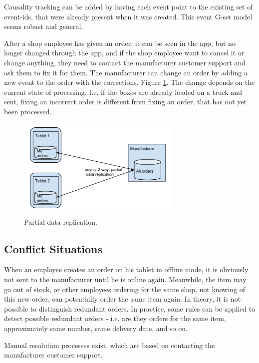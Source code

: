 \documentclass[11pt,a4paper]{report}
\begin{document}
Causality tracking can be added by having each event point to the existing set of event-ids, that were already present when it was created. This event G-set model seems robust and general.

After a shop employee has given an order, it can be seen in the app, but no longer changed through the app, and if the shop employee want to cancel it or change anything, they need to contact the manufacturer customer support and ask them to fix it for them. The manufacturer can change an order by adding a new event to the order with the corrections, Figure \ref{fig:partial_data_replication}. The change depends on the current state of processing. I.e. if the boxes are already loaded on a truck and sent, fixing an incorrect order is different from fixing an order, that has not yet been processed.
\begin{figure}[!h]
  \centering
  \includegraphics[width=0.7\textwidth]{./img/image5.png}

  \caption{Partial data replication.}
  \label{fig:partial_data_replication}
\end{figure}

\subsection{Conflict Situations}

When an employee creates an order on his tablet in offline mode, it is obviously not sent to the manufacturer until he is online again. Meanwhile, the item may go out of stock, or other employees ordering for the same shop, not knowing of this new order, can potentially order the same item again.
In theory, it is not possible to distinguish redundant orders. In practice, some rules can be applied to detect possible redundant orders - i.e. are they orders for the same item, approximately same number, same delivery date, and so on.

Manual resolution processes exist, which are based on contacting the manufacturer customer support.
\end{document}
